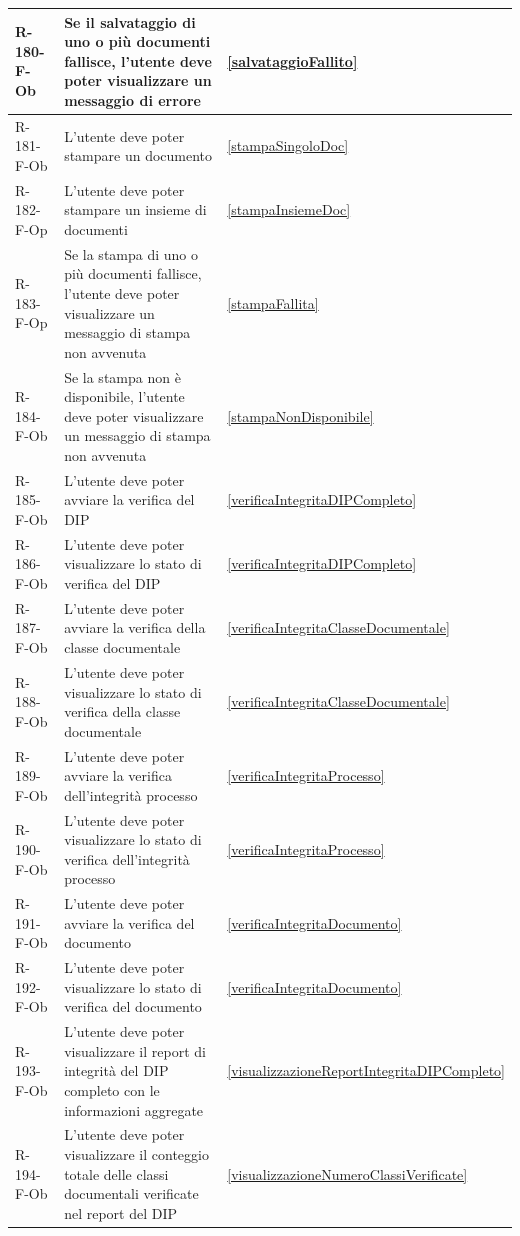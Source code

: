 \begin{longtable}{|p{2.5cm}|p{9.5cm}|p{2.5cm}|}
\hline
R-180-F-Ob & Se il salvataggio di uno o più documenti fallisce, l'utente deve poter visualizzare un messaggio di errore & \ref{salvataggioFallito} \\
\hline
R-181-F-Ob & L'utente deve poter stampare un documento & \ref{stampaSingoloDoc} \\
\hline
R-182-F-Op & L'utente deve poter stampare un insieme di documenti & \ref{stampaInsiemeDoc} \\
\hline
R-183-F-Op & Se la stampa di uno o più documenti fallisce, l'utente deve poter visualizzare un messaggio di stampa non avvenuta & \ref{stampaFallita} \\
\hline
R-184-F-Ob & Se la stampa non è disponibile, l'utente deve poter visualizzare un messaggio di stampa non avvenuta & \ref{stampaNonDisponibile} \\
\hline
R-185-F-Ob & L'utente deve poter avviare la verifica del DIP & \ref{verificaIntegritaDIPCompleto} \\
\hline
R-186-F-Ob & L'utente deve poter visualizzare lo stato di verifica del DIP & \ref{verificaIntegritaDIPCompleto} \\
\hline
R-187-F-Ob & L'utente deve poter avviare la verifica della classe documentale & \ref{verificaIntegritaClasseDocumentale}\\
\hline
R-188-F-Ob & L'utente deve poter visualizzare lo stato di verifica della classe documentale & \ref{verificaIntegritaClasseDocumentale} \\
\hline
R-189-F-Ob & L'utente deve poter avviare la verifica dell'integrità processo & \ref{verificaIntegritaProcesso} \\
\hline
R-190-F-Ob & L'utente deve poter visualizzare lo stato di verifica dell'integrità processo & \ref{verificaIntegritaProcesso} \\
\hline
R-191-F-Ob & L'utente deve poter avviare la verifica del documento & \ref{verificaIntegritaDocumento} \\
\hline
R-192-F-Ob & L'utente deve poter visualizzare lo stato di verifica del documento & \ref{verificaIntegritaDocumento} \\
\hline
R-193-F-Ob & L'utente deve poter visualizzare il report di integrità del DIP completo con le informazioni aggregate & \ref{visualizzazioneReportIntegritaDIPCompleto} \\
\hline
R-194-F-Ob & L'utente deve poter visualizzare il conteggio totale delle classi documentali verificate nel report del DIP & \ref{visualizzazioneNumeroClassiVerificate} \\

\end{longtable}
